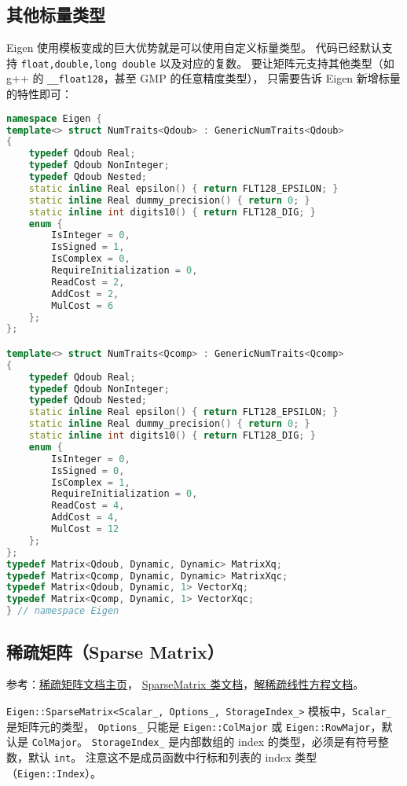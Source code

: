 \subsection{其他标量类型}
Eigen 使用模板变成的巨大优势就是可以使用自定义标量类型。 代码已经默认支持 \verb`float,double,long double` 以及对应的复数。 要让矩阵元支持其他类型（如 g++ 的 \verb`__float128`，甚至 GMP 的任意精度类型）， 只需要告诉 Eigen 新增标量的特性即可：
\begin{lstlisting}[language=cpp]
namespace Eigen {
template<> struct NumTraits<Qdoub> : GenericNumTraits<Qdoub>
{
    typedef Qdoub Real;
    typedef Qdoub NonInteger;
    typedef Qdoub Nested;
    static inline Real epsilon() { return FLT128_EPSILON; }
    static inline Real dummy_precision() { return 0; }
    static inline int digits10() { return FLT128_DIG; }
    enum {
        IsInteger = 0,
        IsSigned = 1,
        IsComplex = 0,
        RequireInitialization = 0,
        ReadCost = 2,
        AddCost = 2,
        MulCost = 6
    };
};

template<> struct NumTraits<Qcomp> : GenericNumTraits<Qcomp>
{
    typedef Qdoub Real;
    typedef Qdoub NonInteger;
    typedef Qdoub Nested;
    static inline Real epsilon() { return FLT128_EPSILON; }
    static inline Real dummy_precision() { return 0; }
    static inline int digits10() { return FLT128_DIG; }
    enum {
        IsInteger = 0,
        IsSigned = 0,
        IsComplex = 1,
        RequireInitialization = 0,
        ReadCost = 4,
        AddCost = 4,
        MulCost = 12
    };
};
typedef Matrix<Qdoub, Dynamic, Dynamic> MatrixXq;
typedef Matrix<Qcomp, Dynamic, Dynamic> MatrixXqc;
typedef Matrix<Qdoub, Dynamic, 1> VectorXq;
typedef Matrix<Qcomp, Dynamic, 1> VectorXqc;
} // namespace Eigen
\end{lstlisting}


\subsection{稀疏矩阵（Sparse Matrix）}

参考：\href{https://eigen.tuxfamily.org/dox/group__TutorialSparse.html}{稀疏矩阵文档主页}， \href{https://eigen.tuxfamily.org/dox/classEigen_1_1SparseMatrix.html}{SparseMatrix 类文档}，\href{https://eigen.tuxfamily.org/dox/group__TopicSparseSystems.html}{解稀疏线性方程文档}。

\verb`Eigen::SparseMatrix<Scalar_, Options_, StorageIndex_>` 模板中，\verb`Scalar_` 是矩阵元的类型， \verb`Options_` 只能是 \verb`Eigen::ColMajor` 或 \verb`Eigen::RowMajor`，默认是 \verb`ColMajor`。 \verb`StorageIndex_` 是内部数组的 index 的类型，必须是有符号整数，默认 \verb`int`。 注意这不是成员函数中行标和列表的 index 类型（\verb`Eigen::Index`）。

